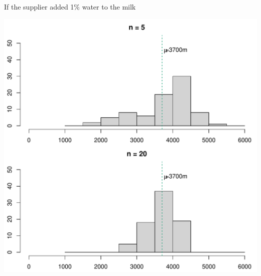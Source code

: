 \documentclass[10pt,handout]{beamer}\usepackage[]{graphicx}\usepackage[]{color}
\makeatletter
\def\maxwidth{ %
  \ifdim\Gin@nat@width>\linewidth
    \linewidth
  \else
    \Gin@nat@width
  \fi
}
\newenvironment{knitrout}{}{} %
\makeatother
\begin{document}
\begin{frame}[fragile]{If the supplier added 1\% water to the milk}
\begin{knitrout}\tiny
{}\color{fgcolor}

{\centering \includegraphics[width=\maxwidth]{figure/unnamed-chunk-19-1} 

}



\end{knitrout}
\end{frame}
\end{document}
